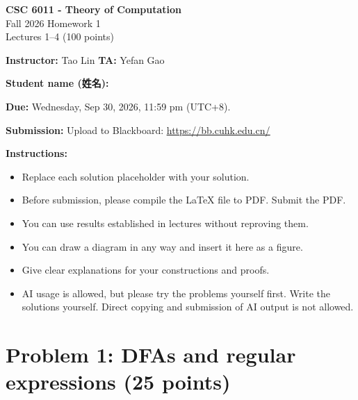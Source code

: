 \documentclass[11pt,a4paper]{article}
\begin{document}
\begin{center}
    {\Large\textbf{CSC 6011 - Theory of Computation}}\\[4pt]
    {\large Fall 2026 \quad Homework 1}\\[4pt]
    Lectures 1--4 \quad (100 points)
\end{center}

\textbf{Instructor:} Tao Lin \hfill \textbf{TA:} Yefan Gao

\textbf{Student name (姓名):} \underline{\hspace{7cm}}

\textbf{Due:} Wednesday, Sep 30, 2026, 11:59 pm (UTC+8).

\textbf{Submission:} Upload to Blackboard: \underline{\url{https://bb.cuhk.edu.cn/}}

\textbf{Instructions:}
\begin{itemize}
\item Replace each solution placeholder with your solution.
\item Before submission, please compile the LaTeX file to PDF. Submit the PDF.
\item You can use results established in lectures without reproving them.
\item You can draw a diagram in any way and insert it here as a figure. 
\item Give clear explanations for your constructions and proofs.
\item AI usage is allowed, but please try the problems yourself first. Write the solutions yourself. Direct copying and submission of AI output is not allowed.
\end{itemize} 

\section*{Problem 1: DFAs and regular expressions (25 points)}
\end{document}
